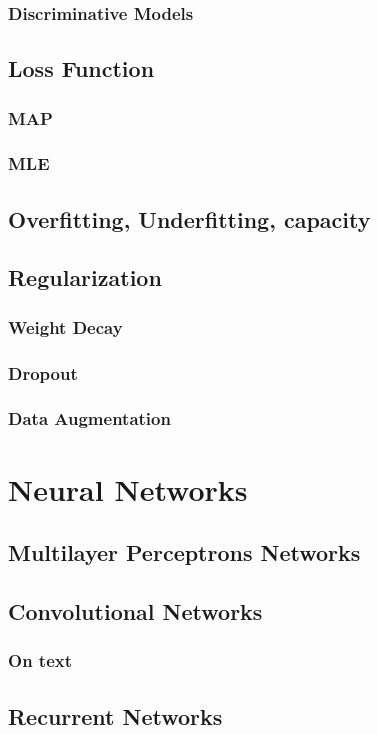 \documentclass[12pt]{article}
\theoremstyle{definition}
\DeclareRobustCommand{\[}{\begin{equation}}
\DeclareRobustCommand{\]}{\end{equation}}
\begin{document}
\subsubsection{Discriminative Models}
\subsection{Loss Function}
\subsubsection{MAP}
\subsubsection{MLE}
\subsection{Overfitting, Underfitting, capacity}
\subsection{Regularization}
\subsubsection{Weight Decay}
\subsubsection{Dropout}
\subsubsection{Data Augmentation}

\section{Neural Networks}
    \subsection{Multilayer Perceptrons Networks}
    \subsection{Convolutional Networks}
        \subsubsection{On text}
    \subsection{Recurrent Networks}
\end{document}
